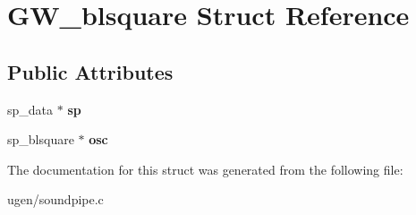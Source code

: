 \hypertarget{structGW__blsquare}{}\section{G\+W\+\_\+blsquare Struct Reference}
\label{structGW__blsquare}
\subsection*{Public Attributes}
\begin{DoxyCompactItemize}
\item 
\hypertarget{structGW__blsquare_a42d3af52310d5b6da8fdc626d1824bab}{}\label{structGW__blsquare_a42d3af52310d5b6da8fdc626d1824bab} 
sp\+\_\+data $\ast$ {\bfseries sp}
\item 
\hypertarget{structGW__blsquare_ab6ddf49b2b8d0f2d34cb2b0176d772e2}{}\label{structGW__blsquare_ab6ddf49b2b8d0f2d34cb2b0176d772e2} 
sp\+\_\+blsquare $\ast$ {\bfseries osc}
\end{DoxyCompactItemize}


The documentation for this struct was generated from the following file\+:\begin{DoxyCompactItemize}
\item 
ugen/soundpipe.\+c\end{DoxyCompactItemize}
